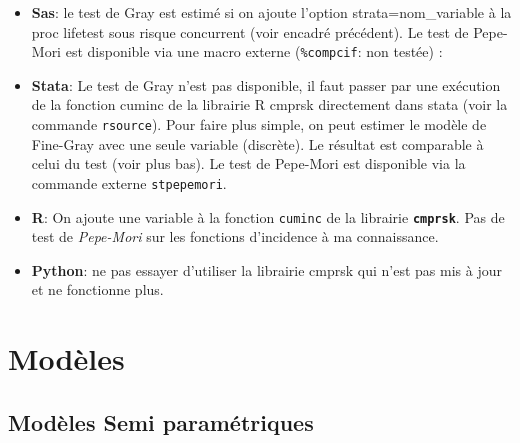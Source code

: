\documentclass[
  12pt,
  letterpaper,
  DIV=11,
  numbers=noendperiod,
  onepage,
  openany]{scrreprt}
\begin{document}
\begin{tcolorbox}[enhanced jigsaw, arc=.35mm, bottomrule=.15mm, titlerule=0mm, colbacktitle=quarto-callout-tip-color!10!white, left=2mm, opacitybacktitle=0.6, toprule=.15mm, title=\textcolor{quarto-callout-tip-color}{\faLightbulb}\hspace{0.5em}{\textbf{R-Stata-Sas-Python}}, colframe=quarto-callout-tip-color-frame, breakable, coltitle=black, opacityback=0, toptitle=1mm, bottomtitle=1mm, rightrule=.15mm, leftrule=.75mm, colback=white]

\begin{itemize}
\item
  \textbf{Sas}: le test de Gray est estimé si on ajoute l'option
  strata=nom\_variable à la proc lifetest sous risque concurrent (voir
  encadré précédent). Le test de Pepe-Mori est disponible via une macro
  externe (\texttt{\%compcif}: non testée) :
\item
  \textbf{Stata}: Le test de Gray n'est pas disponible, il faut passer
  par une exécution de la fonction cuminc de la librairie R cmprsk
  directement dans stata (voir la commande \texttt{rsource}). Pour faire
  plus simple, on peut estimer le modèle de Fine-Gray avec une seule
  variable (discrète). Le résultat est comparable à celui du test (voir
  plus bas). Le test de Pepe-Mori est disponible via la commande externe
  \texttt{stpepemori}.
\item
  \textbf{R}: On ajoute une variable à la fonction \texttt{cuminc} de la
  librairie \textbf{\texttt{cmprsk}}. Pas de test de \emph{Pepe-Mori}
  sur les fonctions d'incidence à ma connaissance.
\item
  \textbf{Python}: ne pas essayer d'utiliser la librairie cmprsk qui
  n'est pas mis à jour et ne fonctionne plus.
\end{itemize}

\end{tcolorbox}

\hypertarget{moduxe8les}{%
\section{\texorpdfstring{\textbf{Modèles}}{Modèles}}\label{moduxe8les}}

\hypertarget{moduxe8les-semi-paramuxe9triques}{%
\subsection{Modèles Semi
paramétriques}\label{moduxe8les-semi-paramuxe9triques}}
\end{document}
